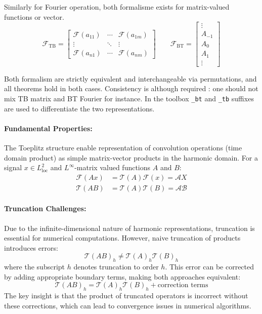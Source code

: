 \documentclass[11pt,a4paper]{article}
\begin{document}
Similarly for Fourier operation, both formalisme exists for matrix-valued functions or vector.
\begin{equation}
    \mathcal{F}_\mathrm{TB} = \begin{bmatrix}
    \mathcal{F}(a_{11}) & \cdots & \mathcal{F}(a_{1m}) \\
    \vdots & \ddots & \vdots \\
    \mathcal{F}(a_{n1}) & \cdots & \mathcal{F}(a_{nm})
    \end{bmatrix}  \qquad  \mathcal{F}_\mathrm{BT} = \begin{bmatrix}
        \vdots \\
     A_{-1} \\
     A_0  \\
    A_1  \\
    \vdots 
    \end{bmatrix}
\end{equation}

Both formalism are strictly equivalent and interchangeable via permutations, and all theorems hold in both cases. Consistency is although required : one should not mix TB matrix and BT Fourier for instance. In the toolbox \texttt{\_bt} and \texttt{\_tb} suffixes are used to differentiate the two representations.

\paragraph{Fundamental Properties:}
The Toeplitz structure enable representation of convolution operations (time domain product) as simple matrix-vector products in the harmonic domain. For a signal $x \in L^2_{\text{loc}}$ and $L^\infty$-matrix valued functions $A$ and $B$:
\begin{align}
\mathcal{F}(Ax) &= \mathcal{T}(A)\mathcal{F}(x) = \mathcal{A}X \\
\mathcal{T}(AB) &= \mathcal{T}(A)\mathcal{T}(B) = \mathcal{A}\mathcal{B}
\end{align}

\paragraph{Truncation Challenges:}
Due to the infinite-dimensional nature of harmonic representations, truncation is essential for numerical computations. However, naive truncation of products introduces errors:
\begin{equation}
\mathcal{T}(AB)_h \neq \mathcal{T}(A)_h \mathcal{T}(B)_h
\end{equation}
where the subscript $h$ denotes truncation to order $h$. This error can be corrected by adding appropriate boundary terms, making both approaches equivalent:
\begin{equation}
\mathcal{T}(AB)_h = \mathcal{T}(A)_h \mathcal{T}(B)_h + \text{correction terms}
\end{equation}
The key insight is that the product of truncated operators is incorrect without these corrections, which can lead to convergence issues in numerical algorithms.
\end{document}
